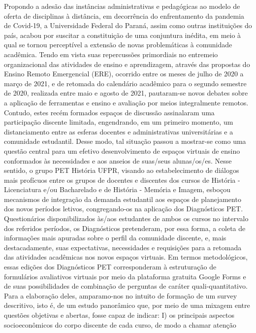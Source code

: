 Propondo a adesão das instâncias administrativas e pedagógicas ao modelo de oferta de
disciplinas à distância, em decorrência do enfrentamento da pandemia de Covid-19, a
Universidade Federal do Paraná, assim como outras instituições do país, acabou por suscitar a
constituição de uma conjuntura inédita, em meio à qual se tornou perceptível a extensão de
novas problemáticas à comunidade acadêmica. Tendo em vista suas repercussões primordiais no
entremeio organizacional das atividades de ensino e aprendizagem, através das propostas do
Ensino Remoto Emergencial (ERE), ocorrido entre os meses de julho de 2020 a março de 2021,
e de retomada do calendário acadêmico para o segundo semestre de 2020, realizada entre maio e
agosto de 2021, pautaram-se novos debates sobre a aplicação de ferramentas e ensino e avaliação
por meios integralmente remotos. Contudo, estes recém formados espaços de discussão
assinalaram uma participação discente limitada, engendrando, em um primeiro momento, um
distanciamento entre as esferas docentes e administrativas universitárias e a comunidade
estudantil. Desse modo, tal situação passou a mostrar-se como uma questão central para um
efetivo desenvolvimento de espaços virtuais de ensino conformados às necessidades e aos
anseios de suas/seus alunas/os/es. Nesse sentido, o grupo PET História UFPR, visando ao
estabelecimento de diálogos mais profícuos entre os grupos de docentes e discentes dos cursos
de História - Licenciatura e/ou Bacharelado e de História - Memória e Imagem, esboçou
mecanismos de integração da demanda estudantil aos espaços de planejamento dos novos
períodos letivos, congregando-os na aplicação dos Diagnósticos PET. Questionários
disponibilizados às/aos estudantes de ambos os cursos no intervalo dos referidos períodos, os
Diagnósticos pretenderam, por essa forma, a coleta de informações mais apuradas sobre o perfil
da comunidade discente, e, mais destacadamente, suas expectativas, necessidades e requisições
para a retomada das atividades acadêmicas nos novos espaços virtuais. Em termos
metodológicos, essas edições dos Diagnósticos PET corresponderam à estruturação de
formulários avaliativos virtuais por meio da plataforma gratuita Google Forms e de suas
possibilidades de combinação de perguntas de caráter quali-quantitativo. Para a elaboração deles,
amparamo-nos no intuito de formação de um survey descritivo, isto é, de um estudo panorâmico
que, por meio de uma mixagem entre questões objetivas e abertas, fosse capaz de indicar: I) os
principais aspectos socioeconômicos do corpo discente de cada curso, de modo a chamar atenção
